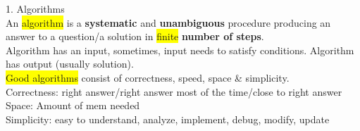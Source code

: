 \color{Blue}
1. Algorithms
\\An \colorbox{Yellow}{algorithm} is a \textbf{systematic} and \textbf{unambiguous} procedure producing an answer to a question/a solution in \colorbox{Yellow}{finite} \textbf{number of steps}.
\\ Algorithm has an input, sometimes, input needs to satisfy conditions. Algorithm has output (usually solution).
\\ \colorbox{Yellow}{Good algorithms} consist of correctness, speed, space \& simplicity. 
\\ Correctness: right answer/right answer most of the time/close to right answer
\\ Space: Amount of mem needed
\\ Simplicity: easy to understand, analyze, implement, debug, modify, update
